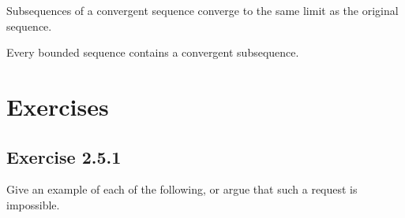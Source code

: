 \begin{tcolorbox}
\begin{thm}
Subsequences of a convergent sequence converge to the same limit as the original sequence.
\end{thm}
\end{tcolorbox}


\begin{tcolorbox}
    \begin{thm}
        Every bounded sequence contains a convergent subsequence.
\end{thm}
\end{tcolorbox}

\section{Exercises}


\subsection{Exercise 2.5.1} Give an example of each of the following, or argue that such a request is impossible. 


